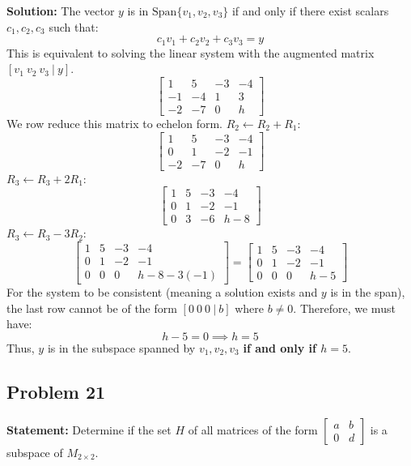 \documentclass[12pt]{article}
\begin{document}
\textbf{Solution:}
The vector $y$ is in $\text{Span}\{v_1, v_2, v_3\}$ if and only if there exist scalars $c_1, c_2, c_3$ such that:
\[ c_1v_1 + c_2v_2 + c_3v_3 = y \]
This is equivalent to solving the linear system with the augmented matrix $[v_1 \ v_2 \ v_3 \ | \ y]$.
\[ \begin{bmatrix} 1 & 5 & -3 & -4 \\ -1 & -4 & 1 & 3 \\ -2 & -7 & 0 & h \end{bmatrix} \]
We row reduce this matrix to echelon form.
$R_2 \leftarrow R_2 + R_1$:
\[ \begin{bmatrix} 1 & 5 & -3 & -4 \\ 0 & 1 & -2 & -1 \\ -2 & -7 & 0 & h \end{bmatrix} \]
$R_3 \leftarrow R_3 + 2R_1$:
\[ \begin{bmatrix} 1 & 5 & -3 & -4 \\ 0 & 1 & -2 & -1 \\ 0 & 3 & -6 & h-8 \end{bmatrix} \]
$R_3 \leftarrow R_3 - 3R_2$:
\[ \begin{bmatrix} 1 & 5 & -3 & -4 \\ 0 & 1 & -2 & -1 \\ 0 & 0 & 0 & h-8 - 3(-1) \end{bmatrix} = \begin{bmatrix} 1 & 5 & -3 & -4 \\ 0 & 1 & -2 & -1 \\ 0 & 0 & 0 & h-5 \end{bmatrix} \]
For the system to be consistent (meaning a solution exists and $y$ is in the span), the last row cannot be of the form $[0 \ 0 \ 0 \ | \ b]$ where $b \neq 0$. 
Therefore, we must have:
\[ h - 5 = 0 \implies h = 5 \]
Thus, $y$ is in the subspace spanned by $v_1, v_2, v_3$ \textbf{if and only if $h = 5$}.

\subsection{Problem 21}
\textbf{Statement:} Determine if the set $H$ of all matrices of the form $\begin{bmatrix} a & b \\ 0 & d \end{bmatrix}$ is a subspace of $M_{2 \times 2}$.
\end{document}
